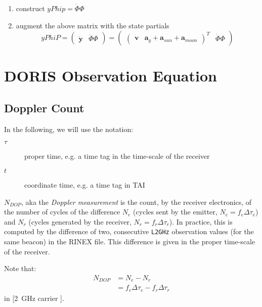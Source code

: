 \begin{enumerate}
    \item construct $yPhip = \dot{\Phi} \Phi$
    
    \item augment the above matrix with the state partials 
        \begin{equation}
            yPhiP = 
            \begin{pmatrix} 
                \dot{\bm{y}} & \dot{\Phi} \Phi 
            \end{pmatrix}  = 
            \begin{pmatrix} 
                \begin{pmatrix} \bm{v} & \bm{a}_g + \bm{a}_{sun} + \bm{a}_{moon} \end{pmatrix}^T 
                & \dot{\Phi} \Phi
            \end{pmatrix}
        \end{equation}
\end{enumerate}

\section{DORIS Observation Equation}
\label{sec:doris-observation-equation}

\subsection{Doppler Count}
\label{ssec:doppler-count}
In the following, we will use the notation:
\begin{description}
  \item[$\tau$] proper time, e.g. a time tag in the time-scale of the receiver
  \item[$t$] coordinate time, e.g. a time tag in TAI
\end{description}

$N_{DOP}$, aka the \emph{Doppler measurement} is the count, by the receiver 
electronics, of the number of cycles of the difference $N_e$ (cycles sent by the 
emitter, $N_e=f_e \Delta \tau_e$) and $N_r$ (cycles generated by the receiver, 
$N_r=f_r \Delta \tau_r$). In practice, this is computed by the difference of two, 
consecutive \texttt{L2GHz} observation values (for the same beacon) in the 
RINEX file. This difference is given in the proper time-scale of the receiver.

Note that:
\begin{equation}
  \begin{split}
    N_{DOP} & = N_e - N_r\\
            & = f_e \Delta\tau_e - f_r \Delta\tau_r 
  \end{split}
\end{equation}
in [\SI{2}{\GHz} carrier \si{\cycles}].

